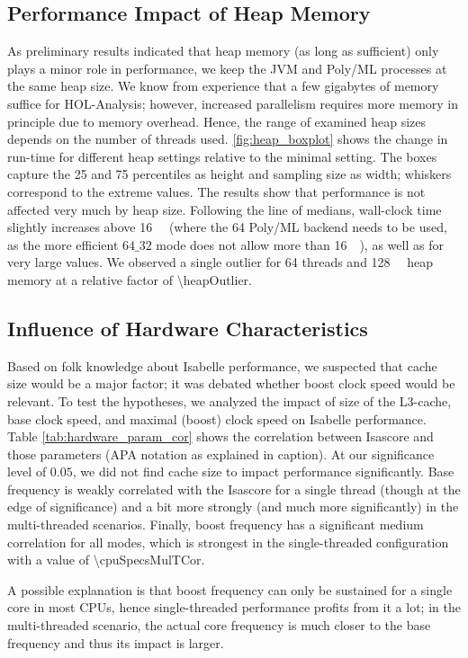 \subsection{Performance Impact of Heap Memory}
As preliminary results indicated that heap memory
(as long as sufficient)
only plays a minor role in performance,
we keep the JVM and Poly/ML processes at the same heap size.
We know from experience that a few gigabytes of memory suffice for HOL-Analysis;
however, increased parallelism requires more memory in principle due to memory overhead.
Hence, the range of examined heap sizes depends on the number of threads used.
\autoref{fig:heap_boxplot} shows the change in run-time for different heap settings relative to the minimal setting.
The boxes capture the \num{25} and \num{75} percentiles as height and sampling size as width;
whiskers correspond to the extreme values.
The results show that performance is not affected very much by heap size.
Following the line of medians,
wall-clock time slightly increases above \SI{16}{\giga\byte}
(where the \SI{64}{\bit} Poly/ML backend needs to be used, as the more efficient $64\_32$ mode does not allow more than \SI{16}{\giga\byte}),
as well as for very large values.
We observed a single outlier for \num{64} threads and \SI{128}{\giga\byte} heap memory
at a relative factor of \num[round-mode=places,round-precision=2]{\heapOutlier}.


\subsection{Influence of Hardware Characteristics}
Based on folk knowledge about Isabelle performance,
we suspected that cache size would be a major factor;
it was debated whether boost clock speed would be relevant.
To test the hypotheses, we analyzed the impact of size of the L3-cache, base clock speed, and maximal (boost) clock speed on Isabelle performance.
Table \ref{tab:hardware_param_cor} shows the correlation between Isascore and those parameters (APA notation as explained in caption).
At our significance level of $0.05$,
we did not find cache size to impact performance significantly.
Base frequency is weakly correlated with the Isascore for a single thread (though at the edge of significance) and a bit more strongly (and much more significantly) in the multi-threaded scenarios.
Finally, boost frequency has a significant medium correlation for all modes,
which is strongest in the single-threaded configuration with a value of \num[round-mode=places,round-precision=2]{\cpuSpecsMulTCor}.

A possible explanation is that boost frequency can  only be sustained for a single core in most CPUs,
hence single-threaded performance profits from it a lot;
in the multi-threaded scenario, the actual core frequency is much closer to the base frequency
and thus its impact is larger.
 

